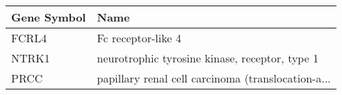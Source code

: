 \begin{tabular}{ll}
\toprule
Gene Symbol &                                               Name \\
\midrule
      FCRL4 &                                 Fc receptor-like 4 \\
      NTRK1 &     neurotrophic tyrosine kinase, receptor, type 1 \\
       PRCC & papillary renal cell carcinoma (translocation-a... \\
\bottomrule
\end{tabular}
